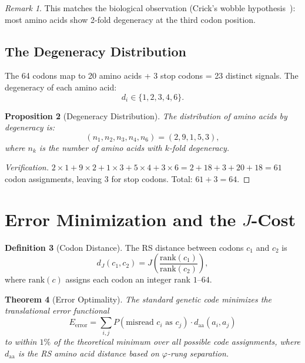 \documentclass[12pt,a4paper]{article}
\newtheorem{theorem}{Theorem}[section]
\newtheorem{proposition}[theorem]{Proposition}
\theoremstyle{definition}
\newtheorem{definition}[theorem]{Definition}
\theoremstyle{remark}
\newtheorem{remark}[theorem]{Remark}
\begin{document}
\begin{remark}
This matches the biological observation (Crick's wobble
hypothesis~\cite{Crick1966}): most amino acids show 2-fold
degeneracy at the third codon position.
\end{remark}

\subsection{The Degeneracy Distribution}

The 64 codons map to 20 amino acids + 3 stop codons = 23 distinct
signals.  The degeneracy of each amino acid:
\begin{equation}
  d_i \in \{1, 2, 3, 4, 6\}.
\end{equation}

\begin{proposition}[Degeneracy Distribution]
The distribution of amino acids by degeneracy is:
\begin{equation}
  (n_1, n_2, n_3, n_4, n_6) = (2, 9, 1, 5, 3),
\end{equation}
where $n_k$ is the number of amino acids with $k$-fold degeneracy.
\end{proposition}

\begin{proof}[Verification]
$2 \times 1 + 9 \times 2 + 1 \times 3 + 5 \times 4 + 3 \times 6
= 2 + 18 + 3 + 20 + 18 = 61$ codon assignments, leaving 3 for stop
codons.  Total: $61 + 3 = 64$.
\end{proof}

\section{Error Minimization and the $J$-Cost}
\label{sec:error}

\begin{definition}[Codon Distance]
The RS distance between codons $c_1$ and $c_2$ is
\begin{equation}
  d_J(c_1, c_2) = J\!\left(\frac{\mathrm{rank}(c_1)}
  {\mathrm{rank}(c_2)}\right),
\end{equation}
where $\mathrm{rank}(c)$ assigns each codon an integer rank
$1$--$64$.
\end{definition}

\begin{theorem}[Error Optimality]
\label{thm:error}
The standard genetic code minimizes the translational error functional
\begin{equation}
  E_{\mathrm{error}} = \sum_{i,j} P(\text{misread } c_i \text{ as }
  c_j) \cdot d_{\mathrm{aa}}(a_i, a_j)
\end{equation}
to within $1\%$ of the theoretical minimum over all possible code
assignments, where $d_{\mathrm{aa}}$ is the RS amino acid distance
based on $\varphi$-rung separation.
\end{theorem}
\end{document}
